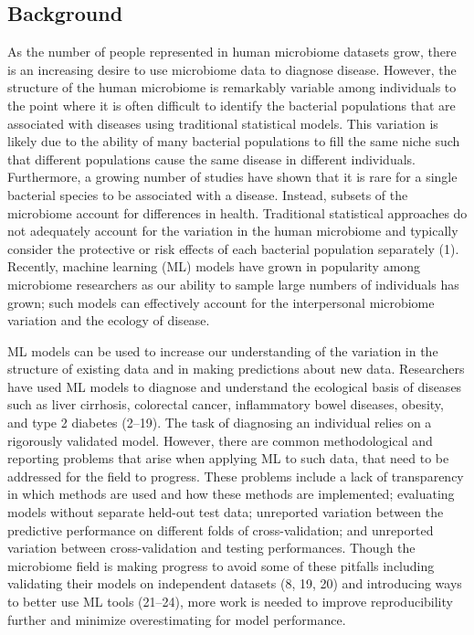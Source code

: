 \documentclass[11pt,]{article}
\begin{document}
\newpage

\subsection{Background}\label{background}

As the number of people represented in human microbiome datasets grow,
there is an increasing desire to use microbiome data to diagnose
disease. However, the structure of the human microbiome is remarkably
variable among individuals to the point where it is often difficult to
identify the bacterial populations that are associated with diseases
using traditional statistical models. This variation is likely due to
the ability of many bacterial populations to fill the same niche such
that different populations cause the same disease in different
individuals. Furthermore, a growing number of studies have shown that it
is rare for a single bacterial species to be associated with a disease.
Instead, subsets of the microbiome account for differences in health.
Traditional statistical approaches do not adequately account for the
variation in the human microbiome and typically consider the protective
or risk effects of each bacterial population separately (1). Recently,
machine learning (ML) models have grown in popularity among microbiome
researchers as our ability to sample large numbers of individuals has
grown; such models can effectively account for the interpersonal
microbiome variation and the ecology of disease.

ML models can be used to increase our understanding of the variation in
the structure of existing data and in making predictions about new data.
Researchers have used ML models to diagnose and understand the
ecological basis of diseases such as liver cirrhosis, colorectal cancer,
inflammatory bowel diseases, obesity, and type 2 diabetes (2--19). The
task of diagnosing an individual relies on a rigorously validated model.
However, there are common methodological and reporting problems that
arise when applying ML to such data, that need to be addressed for the
field to progress. These problems include a lack of transparency in
which methods are used and how these methods are implemented; evaluating
models without separate held-out test data; unreported variation between
the predictive performance on different folds of cross-validation; and
unreported variation between cross-validation and testing performances.
Though the microbiome field is making progress to avoid some of these
pitfalls including validating their models on independent datasets (8,
19, 20) and introducing ways to better use ML tools (21--24), more work
is needed to improve reproducibility further and minimize overestimating
for model performance.
\end{document}
